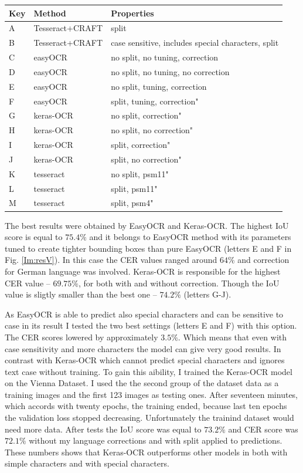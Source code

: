 \begin{table}[!ht]
    \centering
    \begin{tabular}{|l|l|l|}
    \hline
        Key & Method & Properties \\ \hline
        A & Tesseract+CRAFT & split \\
        B & Tesseract+CRAFT & case sensitive, includes special characters, split \\ \hline
        C & easyOCR & no split, no tuning, correction\\
        D & easyOCR & no split, no tuning, no correction \\
        E & easyOCR & no split, tuning, correction\\
        F & easyOCR & split, tuning, correction" \\ \hline
        G & keras-OCR & no split, correction" \\
        H & keras-OCR & no split, no correction" \\ 
        I & keras-OCR & split, correction" \\ 
        J & keras-OCR & split, no correction" \\ \hline
        K & tesseract & no split, psm11" \\ 
        L & tesseract & split, psm11" \\ 
        M & tesseract & split, psm4" \\ \hline
    \end{tabular}
    \label{Tab:resV}
\end{table}

The best results were obtained by EasyOCR and Keras-OCR. The highest IoU score is equal to $75.4\%$ and it belongs to EasyOCR method with its parameters tuned to create tighter bounding boxes than pure EasyOCR (letters E and F in Fig. \ref*{Im:resV}). In this case the CER values ranged around $64\%$ and correction for German language was involved.
Keras-OCR is responsible for the highest CER value -- $69.75\%$, for both with and without correction. Though the IoU value is sligtly smaller than the best one -- $74.2\%$ (letters G-J). 

As EasyOCR is able to predict also special characters and can be sensitive to case in its result I tested the two best settings (letters E and F) with this option. The CER scores lowered by approximately $3.5\%$. Which means that even with case sensitivity and more characters the model can give very good results. In contrast with Keras-OCR which cannot predict special characters and ignores text case without training. To gain this aibility, I trained the Keras-OCR model on the Vienna Dataset. I used the the second group of the dataset data as a training images and the first 123 images as testing ones. After seventeen minutes, which accords with twenty epochs, the training ended, because last ten epochs the validation loss stopped decreasing. Unfortunately the trainind dataset would need more data. After tests the IoU score was equal to $73.2\%$ and CER score was $72.1\%$ without my language corrections and with split applied to predictions. These numbers shows that Keras-OCR outperforms other models in both with simple characters and with special characters.

